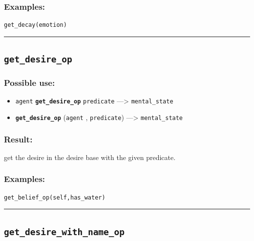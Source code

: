\documentclass[]{book}
\providecommand{\tightlist}{%
  \setlength{\itemsep}{0pt}\setlength{\parskip}{0pt}}
\theoremstyle{definition}
\theoremstyle{definition}
\theoremstyle{definition}
\theoremstyle{remark}
\begin{document}
\subsubsection{Examples:}\label{examples-149}

\begin{verbatim}
get_decay(emotion) 
\end{verbatim}

\begin{center}\rule{0.5\linewidth}{\linethickness}\end{center}

\subsection{\texorpdfstring{\texttt{get\_desire\_op}}{get\_desire\_op}}\label{get_desire_op}

\subsubsection{Possible use:}\label{possible-use-203}

\begin{itemize}
\tightlist
\item
  \texttt{agent} \textbf{\texttt{get\_desire\_op}} \texttt{predicate}
  ---\textgreater{} \texttt{mental\_state}
\item
  \textbf{\texttt{get\_desire\_op}} (\texttt{agent} ,
  \texttt{predicate}) ---\textgreater{} \texttt{mental\_state}
\end{itemize}

\subsubsection{Result:}\label{result-197}

get the desire in the desire base with the given predicate.

\subsubsection{Examples:}\label{examples-150}

\begin{verbatim}
get_belief_op(self,has_water) 
\end{verbatim}

\begin{center}\rule{0.5\linewidth}{\linethickness}\end{center}

\subsection{\texorpdfstring{\texttt{get\_desire\_with\_name\_op}}{get\_desire\_with\_name\_op}}\label{get_desire_with_name_op}
\end{document}
